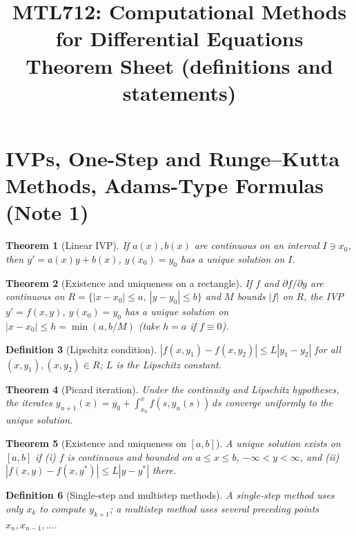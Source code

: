 \documentclass[10pt,a4paper]{article}
\title{\textbf{MTL712: Computational Methods for Differential Equations}\\[4pt]
\large Theorem Sheet (definitions and statements)}
\author{}
\date{}
\theoremstyle{tight}
\newtheorem{theorem}{Theorem}[section]
\newtheorem{definition}[theorem]{Definition}
\begin{document}
\maketitle
\vspace{-3em}
\thispagestyle{plain}
{\small\tableofcontents}

\section{IVPs, One-Step and Runge--Kutta Methods, Adams-Type Formulas (Note 1)}

\begin{theorem}[Linear IVP]
If \(a(x),b(x)\) are continuous on an interval \(I\ni x_0\), then
\(y'=a(x)y+b(x)\), \(y(x_0)=y_0\) has a unique solution on \(I\).
\end{theorem}

\begin{theorem}[Existence and uniqueness on a rectangle]
If \(f\) and \(\partial f/\partial y\) are continuous on
\(R=\{|x-x_0|\le a,\ |y-y_0|\le b\}\) and \(M\) bounds \(|f|\) on \(R\), the IVP
\(y'=f(x,y)\), \(y(x_0)=y_0\) has a unique solution on
\(|x-x_0|\le h=\min(a,b/M)\) (take \(h=a\) if \(f\equiv0\)).
\end{theorem}

\begin{definition}[Lipschitz condition]
\(|f(x,y_1)-f(x,y_2)|\le L|y_1-y_2|\) for all \((x,y_1),(x,y_2)\in R\); \(L\) is the Lipschitz constant.
\end{definition}

\begin{theorem}[Picard iteration]
Under the continuity and Lipschitz hypotheses, the iterates
\(y_{n+1}(x)=y_0+\int_{x_0}^xf(s,y_n(s))\,ds\) converge uniformly to the unique solution.
\end{theorem}

\begin{theorem}[{Existence and uniqueness on \([a,b]\)}]
A unique solution exists on \([a,b]\) if (i) \(f\) is continuous and bounded on
\(a\le x\le b\), \(-\infty<y<\infty\), and (ii) \(|f(x,y)-f(x,y^*)|\le L|y-y^*|\) there.
\end{theorem}

\begin{definition}[Single-step and multistep methods]
A single-step method uses only \(x_k\) to compute \(y_{k+1}\); a multistep method uses
several preceding points \(x_n,x_{n-1},\dots\).
\end{definition}
\end{document}
